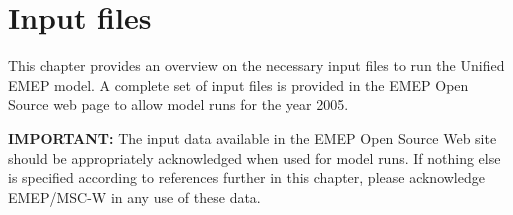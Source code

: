 \chapter{Input files}
\label{ch:InputFiles}

This chapter provides an overview on the necessary input files to run 
the Unified EMEP model. A complete set of input files is provided in
the EMEP Open Source web page to allow model runs for the year 2005.

{\bf IMPORTANT:} The input data available in the EMEP Open Source Web
site should be appropriately acknowledged when used for model runs.
If nothing else is specified according to references further in this
chapter, please acknowledge EMEP/MSC-W in
any use of these data.





